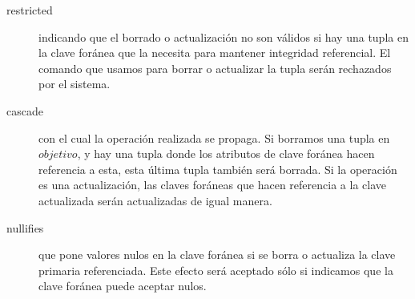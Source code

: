 \documentclass[a4paper]{article}
\begin{document}
\begin{description}
    \item[restricted] indicando que el borrado o actualizaci\'on no son v\'alidos si hay
    una tupla en la clave for\'anea que la necesita para mantener integridad referencial.
    El comando que usamos para borrar o actualizar la tupla ser\'an rechazados por el 
    sistema.
    \item[cascade] con el cual la operaci\'on realizada se propaga. Si borramos una
    tupla en $objetivo$, y hay una tupla donde los atributos de clave for\'anea
    hacen referencia a esta, esta \'ultima tupla tambi\'en ser\'a borrada. Si
    la operaci\'on es una actualizaci\'on, las claves for\'aneas que hacen referencia
    a la clave actualizada ser\'an actualizadas de igual manera.
    \item[nullifies] que pone valores nulos en la clave for\'anea si se borra o
    actualiza la clave primaria referenciada. Este efecto ser\'a aceptado s\'olo si
    indicamos que la clave for\'anea puede aceptar nulos.
\end{description}
\end{document}

